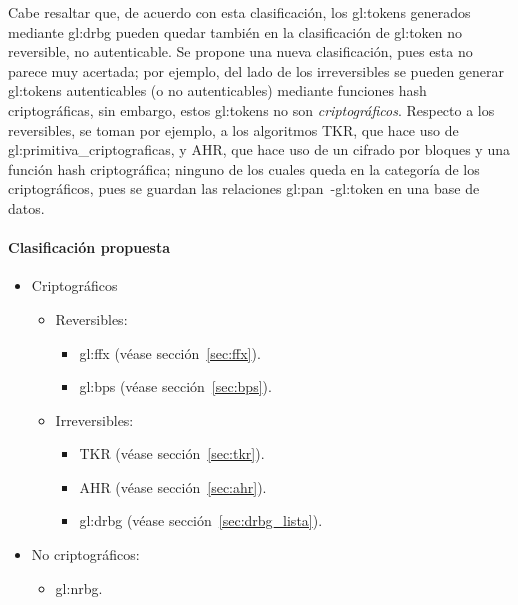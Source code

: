 Cabe resaltar que, de acuerdo con esta clasificación, los \glspl{gl:token}
generados mediante \gls{gl:drbg} pueden quedar también en la clasificación
de \gls{gl:token} no reversible, no autenticable. Se propone una nueva
clasificación, pues esta no parece muy acertada; por ejemplo, del lado de los
irreversibles se pueden generar \glspl{gl:token} autenticables (o no
autenticables) mediante funciones hash criptográficas, sin embargo, estos
\glspl{gl:token} no son \textit{criptográficos}. Respecto a los reversibles,
se toman por ejemplo, a los algoritmos TKR, que hace uso de
\glspl{gl:primitiva_criptografica}, y AHR, que hace uso de un cifrado
por bloques y una función hash criptográfica; ninguno de los cuales queda en
la categoría de los criptográficos, pues se guardan las relaciones
\gls{gl:pan}~-\gls{gl:token} en una base de datos.

\paragraph{Clasificación propuesta}

\begin{itemize}
  \item{Criptográficos}
    \begin{itemize}
      \item Reversibles:
        \begin{itemize}
          \item \Gls{gl:ffx} (véase sección~\ref{sec:ffx}).
          \item \Gls{gl:bps} (véase sección~\ref{sec:bps}).
        \end{itemize}
      \item Irreversibles:
        \begin{itemize}
          \item TKR (véase sección~\ref{sec:tkr}).
          \item AHR (véase sección~\ref{sec:ahr}).
          \item \Gls{gl:drbg} (véase sección~\ref{sec:drbg_lista}).
        \end{itemize}
    \end{itemize}
  \item No criptográficos:
    \begin{itemize}
      \item \gls{gl:nrbg}.
    \end{itemize}
\end{itemize}

